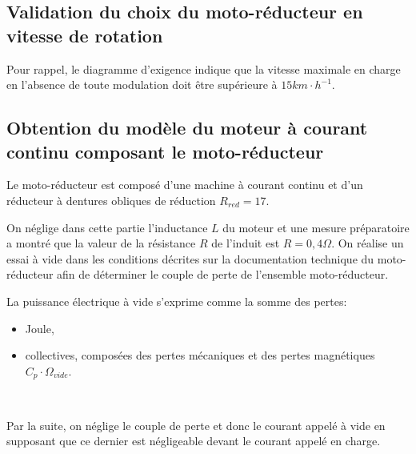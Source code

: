 \subsection{Validation du choix du moto-réducteur en vitesse de rotation}

Pour rappel, le diagramme d'exigence indique que la vitesse maximale en charge en l'absence de toute modulation doit être supérieure à $15km\cdot h^{-1}$.


\subsection{Obtention du modèle du moteur à courant continu composant le moto-réducteur}

Le moto-réducteur est composé d'une machine à courant continu et d'un réducteur à dentures obliques de réduction $R_{red}=17$.

On néglige dans cette partie l'inductance $L$ du moteur et une mesure préparatoire a montré que la valeur de la résistance $R$ de l'induit est $R=0,4\Omega$. On réalise un essai à vide dans les conditions
décrites sur la documentation technique du moto-réducteur afin de déterminer le couple de perte de l'ensemble moto-réducteur.

La puissance électrique à vide s'exprime comme la somme des pertes:
\begin{itemize}
 \item Joule,
 \item collectives, composées des pertes mécaniques et des pertes magnétiques $C_p\cdot \Omega_{vide}$.
\end{itemize} 



~\

Par la suite, on néglige le couple de perte et donc le courant appelé à vide en supposant que ce dernier est négligeable devant le courant appelé en charge.

